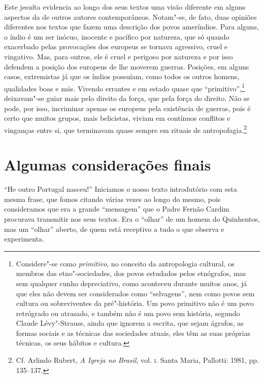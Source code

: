  Este jesuíta evidencia ao longo dos seus textos uma visão diferente
em alguns aspectos da de outros autores contemporâneos. Notam"-se, de
fato, duas opiniões diferentes nos textos que fazem uma descrição dos
povos ameríndios. Para alguns, o índio é um ser inócuo, inocente e
pacífico por natureza, que só quando exacerbado pelas provocações dos
europeus se tornava agressivo, cruel e vingativo. Mas, para outros, ele
é cruel e perigoso por natureza e por isso defendem a posição dos
europeus de lhe moverem guerras. Posições, em alguns casos, extremistas já que os índios possuíam,
como todos os outros homens, qualidades boas e más. Vivendo errantes e
em estado quase que ``primitivo'',\footnote{ Considere"-se como
\textit{primitivo}, no conceito da antropologia cultural, os membros 
das etno"-sociedades, dos povos estudados pelos etnógrafos, mas
sem qualquer cunho depreciativo, como aconteceu durante muitos anos, já
que eles não devem ser considerados como ``selvagens'', nem como povos
sem cultura ou sobreviventes da pré"-história. Um povo primitivo não é
um povo retrógrado ou atrasado, e também não é um povo sem história,
segundo Claude Lévy"-Strauss, ainda que ignorem a escrita, que sejam
ágrafos, as formas sociais e as técnicas das sociedades atuais, eles têm as
suas próprias técnicas, os seus hábitos e cultura.} deixavam"-se guiar
mais pelo direito da força, que pela força do direito. Não se pode, por
isso, incriminar apenas os europeus pela existência de guerras, pois é
certo que muitos grupos, mais belicistas, viviam em contínuos
conflitos e vinganças entre si, que terminavam quase sempre em rituais
de antropofagia.\footnote{ Cf. Arlindo Rubert, \textit{A Igreja
no Brasil}, vol. \textsc{i}. Santa Maria, Pallotti: 1981, pp. 135--137.} 

\section{Algumas considerações finais}

``He outro Portugal nasceu!'' Iniciamos o nosso texto introdutório com esta mesma frase,
que fomos citando várias vezes ao longo do mesmo, pois consideramos que
era a grande ``mensagem'' que o Padre Fernão Cardim procurava transmitir
nos seus textos. Era o ``olhar'' de um homem do Quinhentos, mas um ``olhar'' 
aberto, de quem está receptivo a tudo o que observa e experimenta. 

